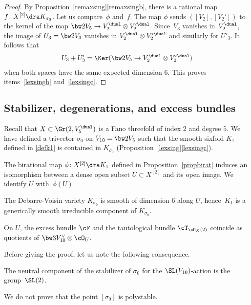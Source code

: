 \begin{proof}
By Proposition~\ref{remaxsing}\eqref{remaxsingb}, there is a rational map
$f\colon X^{[2]}\dra K_{\sigma_0}$. Let us compare~$\phi$ and~$f$. The map
$\phi$ sends $([V_2],[V_2'])$ to the kernel of the
map $\bw2V_5\to V_2^\dual\otimes V_2^{\prime\dual}$. Since~$V_3$ vanishes in~$V_2^\dual$,
the image of $U_3=\bw2V_3$ vanishes in $V_2^\dual\otimes V_2^{\prime\dual}$ and similarly for
$U'_3$. It follows that
\[
U_3+U'_3=\Ker (\bw2V_5\to V_2^\dual\otimes V_2^{\prime\dual})
\]
when both spaces have the same expected dimension $6$. This proves items~\eqref{lexsingb} and~\eqref{lexsingc}.
\end{proof}

\subsection{Stabilizer, degenerations, and excess bundles}
Recall that $X\subset \Gr(2,V_5^\dual)$ is a Fano threefold of index $2$ and degree $5$. We have defined a trivector $\sigma_0$ on $V_{10}=\bw2V_5$ such that the smooth sixfold $K_1$ defined in \eqref{defk1} is contained in $K_{\sigma_0}$ (Proposition~\ref{lexsing}\eqref{lexsingc}).

The birational map
$\phi\colon X^{[2]}\dra K_1$ defined in Proposition~\ref{propbirat}
induces an isomorphism between
a dense open subset $U\subset X^{[2]}$ and its open image. We identify $U$ with~$\phi(U)$.

\skpt
\begin{prop}\label{prop69}
\begin{enumeratea}
\item\label{prop69a}
The Debarre-Voisin variety $K_{\sigma_0}$ is smooth of dimension $6$ along
$U$, hence~$K_1$ is a generically smooth irreducible component of $K_{\sigma_0}$.

\item\label{prop69b}
On $U$, the excess bundle $\cF$ and the tautological bundle
$\cT_{\cO_X(2)}$ coincide as quotients of $\bw3V_{10}^\vee\otimes \cO_U$.
\end{enumeratea}
\end{prop}

Before giving the proof, let us note the following consequence.

\begin{coro} \label{corstabgenus6}
The neutral component of the stabilizer of $\sigma_0$ for the $\SL(V_{10})$-action is the group~$\SL( 2)$.
\end{coro}

{We do not prove that the point $[\sigma_0]$ is polystable.}

